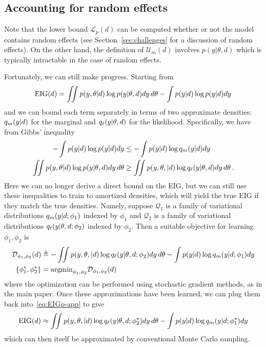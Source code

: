 \subsection{Accounting for random effects}
Note that the lower bound $\mathcal{L}_p(d)$ can be computed whether or not the model contains random effects (see Section~\ref{sec:challenges} for a discussion of random effects). On the other hand, the definition of $\mathcal{U}_m(d)$ involves $p(y|\theta,d)$ which is typically intractable in the case of random effects.

Fortunately, we can still make progress. Starting from
\begin{equation}
\label{eq:EIGp-app}
	\text{EIG}(d) = \iint  p(y, \theta | d) \log p(y|\theta, d) dy\,d\theta - \int p(y | d) \log p(y | d) dy
\end{equation}
and we can bound each term separately in terms of two approximate densities: $q_m(y|d)$ for the marginal and $q_\ell(y|\theta,d)$ for the likelihood. Specifically,
we have from Gibbs' inequality
\begin{align}
	-\int p(y | d) \log p(y | d) dy &\le -\int  p(y|d)\log q_m(y|d) dy \\
	\iint p(y, \theta |d) \log p(y|\theta,d) dy\,d\theta & \ge \iint p(y, \theta, | d) \log q_\ell(y|\theta, d) dy\,d\theta \,.
\end{align}
Here we can no longer derive a direct bound on the EIG, but we can still
use these inequalities to train to amortized densities, which will yield the
true EIG if they match the true densities.
Namely, suppose $\mathcal{Q}_1$ is a family of variational distributions  $q_m(y|d; \phi_1)$ indexed by $\phi_1$ 
and $\mathcal{Q}_2$ is a family of variational distributions $q_\ell(y|\theta,d; \phi_2)$ indexed by $\phi_2$. Then a suitable objective for learning $\phi_1, \phi_2$ is
\begin{align}
\mathcal{D}_{\phi_1, \phi_2}(d) &\triangleq
- \iint  p(y, \theta, | d) \log q_\ell(y|\theta, d; \phi_2)dy\,d\theta 
-\int p(y | d) \log q_m(y | d; \phi_1)dy  \\
\{\phi_1^*, \phi_2^*\}	&= \text{argmin}_{\phi_1, \phi_2} \mathcal{D}_{\phi_1, \phi_2}(d)
	\end{align}
where the optimization can be performed using stochastic gradient methods, as in the main paper. Once these approximations have been learned, we can plug
them back into~\eqref{eq:EIGp-app} to give
\begin{equation}
	 \text{EIG}(d) \approx  \iint  p(y, \theta, | d)\log q_\ell(y|\theta, d; \phi_2^*) dy\,d\theta 
	 -\int p(y | d) \log q_m(y | d; \phi_1^*) dy
\end{equation}
which can then itself be approximated by conventional Monte Carlo
sampling.


